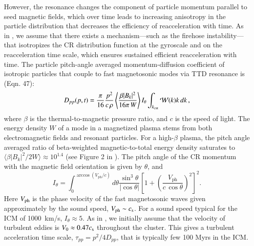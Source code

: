 \documentclass[useAMS,usenatbib]{mn2e}
\newcommand{\Vph}{V_\mathrm{ph}}
\begin{document}
However, the resonance changes the component of particle momentum
parallel to seed magnetic fields, which over time leads to increasing
anisotropy in the particle distribution that decreases the efficiency
of reacceleration with time. As in \citet{brunetti11}, we assume that
there exists a mechanism---such as the firehose instability---that
isotropizes the CR distribution function at the gyroscale and on the
reacceleration time scale, which ensures sustained efficient
reacceleration with time. The particle pitch-angle averaged
momentum-diffusion coefficient of isotropic particles that couple to
fast magnetosonic modes via TTD resonance is \cite{brunetti07}
(Eqn. 47):
\begin{eqnarray}
  D_{pp}(p,t) = \frac{\pi}{16} \frac{p^2}{c\,\rho}
  \left\langle\frac{\beta |B_k|^2}{16 \pi \,W}\right\rangle
  I_\theta
  \int_{k_{\mathrm{cut}}}\mathcal{W}(k)k\,d k\,,
\label{eq:dpp}
\end{eqnarray}
where $\beta$ is the thermal-to-magnetic pressure ratio, and $c$
is the speed of light. The energy density $W$ of a mode in a
magnetized plasma stems from both electromagnetic fields and resonant
particles. For a high-$\beta$ plasma, the pitch angle averaged ratio of
beta-weighted magnetic-to-total energy density saturates to $\langle\beta
|B_k|^2/2W\rangle\approx 10^{1.4}$ (see Figure 2 in
\citealt{brunetti07}). The pitch angle of the CR momentum with the
magnetic field orientation is given by $\theta$, and
\begin{equation}
  \label{eq:I_theta}
  I_\theta=\int_0^{\arccos(\Vph/c)} d\theta {\frac{ \sin^3 \theta }{
    |\cos \theta | }}
\left[1+\left(\frac{\Vph}{c\,\cos{\theta}}\right)^2\right]^2.
\end{equation}
Here $V_{\mathrm{ph}}$ is the phase velocity of the fast magnetosonic waves given
approximately by the sound speed, $\Vph \sim c_\rmn{s}$. For a sound speed
typical for the ICM of 1000~km/s, $I_\theta\approx5$. As in \cite{brunetti07},
we initially assume that the velocity of turbulent eddies is $V_0\approx 0.47
c_{\mathrm{s}}$ throughout the cluster. This gives a turbulent acceleration time
scale, $\tau_{pp} = p^2/4D_{pp}$, that is typically few 100 Myrs in the ICM.
\end{document}
